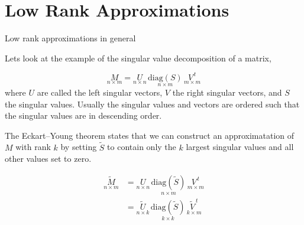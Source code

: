 \documentclass[11pt,ignorenonframetext,]{beamer}
\begin{document}
\hypertarget{low-rank-approximations}{%
\section{Low Rank Approximations}\label{low-rank-approximations}}

\begin{frame}{Low rank approximations in general}
\protect\hypertarget{low-rank-approximations-in-general}{}

Lets look at the example of the singular value decomposition of a
matrix,

\[ \underset{n \times m}{M} = \underset{n \times n}{U}\,\underset{n \times m}{\text{diag}(S)}\,\underset{m \times m}{V^{\,t}} \]
where \(U\) are called the left singular vectors, \(V\) the right
singular vectors, and \(S\) the singular values. Usually the singular
values and vectors are ordered such that the singular values are in
descending order.

\pause

The Eckart--Young theorem states that we can construct an
approximatation of \(M\) with rank \(k\) by setting \(\tilde S\) to
contain only the \(k\) largest singular values and all other values set
to zero.

\[ 
\begin{aligned}
\underset{n \times m}{\tilde M} 
  &= \underset{n \times n}{U}\,\underset{n \times m}{\text{diag}(\tilde S)}\,\underset{m \times m}{V^{\,t}} \\
  &= \underset{n \times k}{\tilde U}\,\underset{k \times k}{\text{diag}(\tilde S)}\,\underset{k \times m}{\tilde{V}^{\,t}} 
\end{aligned}
\]

\end{frame}
\end{document}
